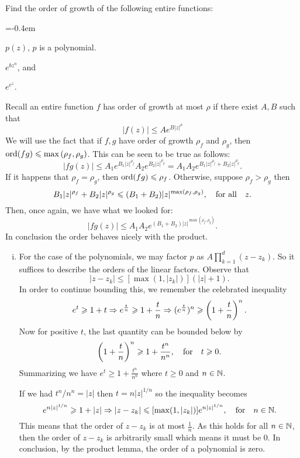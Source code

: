 \documentclass[12pt]{memoir}
\begin{document}
\begin{Ej}
    Find the order of growth of the following entire functions:
    \begin{enumerate}[i)]
        \itemsep=-0.4em
        \begin{multicols}{3}
        \item $p(z)$, $p$ is a polynomial.
        \item $e^{bz^n}$, and
        \item $e^{e^z}$.
        \end{multicols}
    \end{enumerate}
\end{Ej}

\begin{ptcbr}
    Recall an entire function $f$ has order of growth at most $\rho$ if there exist $A,B$ such that 
    $$|f(z)|\leq Ae^{B|z|^\rho}$$
    We will use the fact that if $f,g$ have order of growth $\rho_f$ and $\rho_g$, then $\operatorname{ord}(fg)\leqslant\max{(\rho_f,\rho_g)}$. This can be seen to be true as follows:
    $$|fg(z)|\leq A_1e^{B_1|z|^{\rho_f}}A_2e^{B_2|z|^{\rho_g}}=A_1A_2e^{B_1|z|^{\rho_f}+B_2|z|^{\rho_g}}.$$
    If it happens that $\rho_f=\rho_g$, then $\operatorname{ord}(fg)\leqslant\rho_f$. Otherwise, suppose $\rho_f>\rho_g$ then 
    $$B_1|z|^{\rho_f}+B_2|z|^{\rho_g}\leqslant (B_1+B_2)|z|^{\max(\rho_f,\rho_g)},\quad\text{for all}\quad z.$$
    Then, once again, we have what we looked for:
    $$|fg(z)|\leq A_1A_2e^{(B_1+B_2)|z|^{\max(\rho_f,\rho_g)}}.$$
    In conclusion the order behaves nicely with the product.
    \begin{enumerate}[i)]
        \itemsep=-0.4em
        \item For the case of the polynomials, we may factor $p$ as $A\prod_{k=1}^{d}(z-z_k)$. So it suffices to describe the orders of the linear factors. Observe that 
        $$|z-z_k|\leq [\max(1,|z_k|)](|z|+1).$$
        In order to continue bounding this, we remember the celebrated inequality 
        $$e^t\geqslant 1+t\Rightarrow e^{\frac{t}{n}}\geqslant1+\frac{t}{n}\Rightarrow (e^{\frac{t}{n}})^{n}\geqslant\left(1+\frac{t}{n}\right)^{n}.$$
        Now for positive $t$, the last quantity can be bounded below by 
        $$\left(1+\frac{t}{n}\right)^{n}\geqslant1+\frac{t^n}{n^n},\quad\text{for}\quad t\geqslant 0.$$
        Summarizing we have $e^t\geq 1+\frac{t^n}{n^n}$ where $t\geq 0$ and $n\in\mathbb{N}$.\par 
        If we had $t^n/n^n=|z|$ then $t=n|z|^{1/n}$ so the inequality becomes 
        $$e^{n|z|^{1/n}}\geqslant 1+|z|\Rightarrow |z-z_k|\leqslant [\max(1,|z_k|)]e^{n|z|^{1/n}},\quad\text{for}\quad n\in\mathbb{N}.$$
        This means that the order of $z-z_k$ is at most $\frac{1}{n}$. As this holds for all $n\in\mathbb{N}$, then the order of $z-z_k$ is arbitrarily small which means it must be $0$. In conclusion, by the product lemma, the order of a polynomial is zero.

\end{enumerate}
\end{ptcbr}
\end{document}
